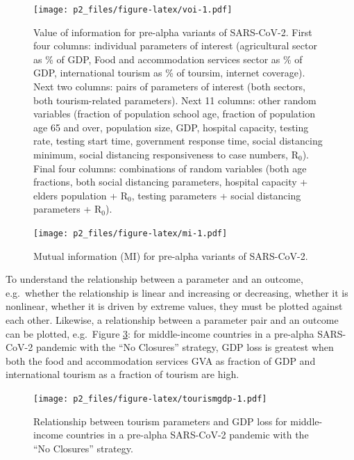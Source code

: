 \documentclass[
]{article}
\begin{document}
\begin{figure}
\centering
\texttt{[image: p2\_files/figure-latex/voi-1.pdf]}
\caption{\label{fig:voi}\footnotesize Value of information for pre-alpha variants of SARS-CoV-2. First four columns: individual parameters of interest (agricultural sector as \% of GDP, Food and accommodation services sector as \% of GDP, international tourism as \% of toursim, internet coverage). Next two columns: pairs of parameters of interest (both sectors, both tourism-related parameters). Next 11 columns: other random variables (fraction of population school age, fraction of population age 65 and over, population size, GDP, hospital capacity, testing rate, testing start time, government response time, social distancing minimum, social distancing responsiveness to case numbers, R\(_0\)). Final four columns: combinations of random variables (both age fractions, both social distancing parameters, hospital capacity + elders population + R\(_0\), testing parameters + social distancing parameters + R\(_0\)).}
\end{figure}

\enlargethispage{4\baselineskip}

\begin{figure}
\centering
\texttt{[image: p2\_files/figure-latex/mi-1.pdf]}
\caption{\label{fig:mi}Mutual information (MI) for pre-alpha variants of SARS-CoV-2.}
\end{figure}

\newpage

To understand the relationship between a parameter and an outcome, e.g.~whether the relationship is linear and increasing or decreasing, whether it is nonlinear, whether it is driven by extreme values, they must be plotted against each other. Likewise, a relationship between a parameter pair and an outcome can be plotted, e.g.~Figure \ref{fig:tourismgdp}: for middle-income countries in a pre-alpha SARS-CoV-2 pandemic with the ``No Closures'' strategy, GDP loss is greatest when both the food and accommodation services GVA as fraction of GDP and international tourism as a fraction of tourism are high.

\begin{figure}
\centering
\texttt{[image: p2\_files/figure-latex/tourismgdp-1.pdf]}
\caption{\label{fig:tourismgdp}Relationship between tourism parameters and GDP loss for middle-income countries in a pre-alpha SARS-CoV-2 pandemic with the ``No Closures'' strategy.}
\end{figure}
\end{document}
